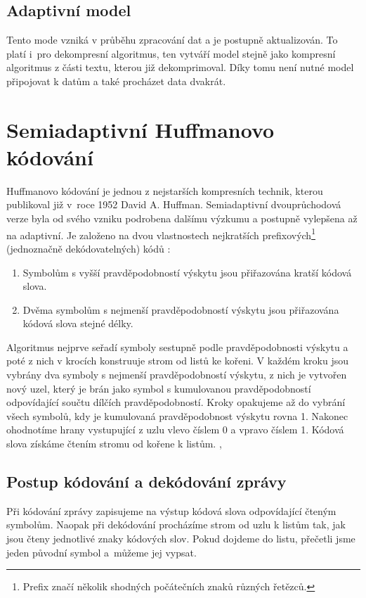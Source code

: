 \subsection{Adaptivní model}
Tento mode vzniká v průběhu zpracování dat a je postupně aktualizován. To platí i~pro dekompresní algoritmus, ten vytváří model stejně jako kompresní algoritmus z části textu, kterou již dekomprimoval. Díky tomu není nutné model připojovat k datům a také procházet data dvakrát.

\section{Semiadaptivní Huffmanovo kódování}
\label{huffmanovoKodovani}
Huffmanovo kódování je jednou z nejstarších kompresních technik, kterou publikoval již v~roce 1952 David A. Huffman. Semiadaptivní dvouprůchodová verze byla od svého vzniku podrobena dalšímu výzkumu a postupně vylepšena až na adaptivní. Je založeno na dvou vlastnostech nejkratších prefixových\footnote{Prefix značí několik shodných počátečních znaků různých řetězců.} (jednoznačně dekódovatelných) kódů \cite{introductionToDataCompression}:

\begin{enumerate}
\item Symbolům s vyšší pravděpodobností výskytu jsou přiřazována kratší kódová slova.
\item Dvěma symbolům s nejmenší pravděpodobností výskytu jsou přiřazována kódová slova stejné délky.
\end{enumerate}

Algoritmus nejprve seřadí symboly sestupně podle pravděpodobnosti výskytu a poté z nich v krocích konstruuje strom od listů ke kořeni. V každém kroku jsou vybrány dva symboly s nejmenší pravděpodobností výskytu, z nich je vytvořen nový uzel, který je brán jako symbol s kumulovanou pravděpodobností odpovídající součtu dílčích pravděpodobností. Kroky opakujeme až do vybrání všech symbolů, kdy je kumulovaná pravděpodobnost výskytu rovna 1. Nakonec ohodnotíme hrany vystupující z uzlu vlevo číslem 0 a vpravo číslem 1. Kódová slova získáme čtením stromu od kořene k listům. \cite{dataCompression}, \cite{introductionToDataCompression}

\subsection{Postup kódování a dekódování zprávy}
Při kódování zprávy zapisujeme na výstup kódová slova odpovídající čteným symbolům. Naopak při dekódování procházíme strom od uzlu k listům tak, jak jsou čteny jednotlivé znaky kódových slov. Pokud dojdeme do listu, přečetli jsme jeden původní symbol a~můžeme jej vypsat.

